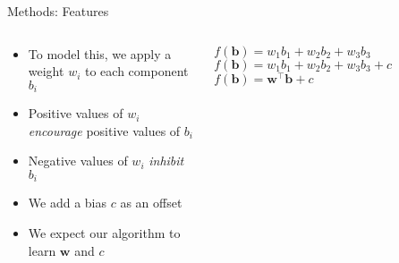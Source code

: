 \begin{slide}{Methods: Features}
  \begin{columns}
  \begin{column}{0.55\textwidth}
  \begin{itemize}
    \item<1-> To model this, we apply a weight $w_i$ to each component $b_i$
    \item<2-> Positive values of $w_i$ \emph{encourage} positive values of $b_i$
    \item<3-> Negative values of $w_i$ \emph{inhibit} $b_i$
    \item<4-> We add a bias $c$ as an offset %
    \item<5-> We expect our algorithm to learn $\mathbf{w}$ and $c$%
  \end{itemize}
  \end{column}
  \begin{column}{0.45\textwidth}
    \centering
     {$f(\mathbf{b}) = w_1b_1 + w_2b_2 + w_3b_3$}
     {$f(\mathbf{b}) = w_1b_1 + w_2b_2 + w_3b_3 + c$}
     {$f(\mathbf{b}) = \mathbf{w}^\top\mathbf{b} + c$}
  \end{column}
\end{columns}
\end{slide}

